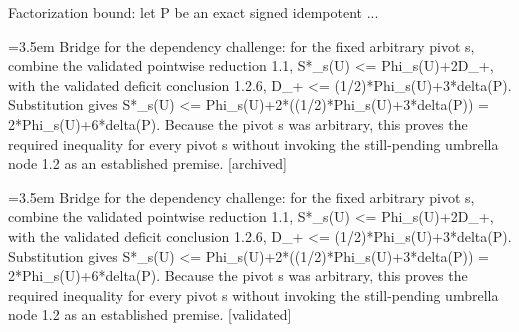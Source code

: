 \documentclass{article}
\newcommand{\step}[1]{\par\noindent\hangindent=3.5em\hangafter=1%
  \makebox[3.5em][l]{\textbf{#1.}}}
\newcommand{\steptag}[1]{\hfill{\small\textsf{[#1]}}}
\begin{document}
\begin{proofbox}{Factorization bound: let P be an exact signed idempotent ...}
\step{1.3.1} Bridge for the dependency challenge: for the fixed arbitrary pivot s, combine the validated pointwise reduction 1.1, S*\_s(U) <= Phi\_s(U)+2D\_+, with the validated deficit conclusion 1.2.6, D\_+ <= (1/2)*Phi\_s(U)+3*delta(P). Substitution gives S*\_s(U) <= Phi\_s(U)+2*((1/2)*Phi\_s(U)+3*delta(P)) = 2*Phi\_s(U)+6*delta(P). Because the pivot s was arbitrary, this proves the required inequality for every pivot s without invoking the still-pending umbrella node 1.2 as an established premise. \steptag{archived} \\[4pt]
\step{1.3.2} Bridge for the dependency challenge: for the fixed arbitrary pivot s, combine the validated pointwise reduction 1.1, S*\_s(U) <= Phi\_s(U)+2D\_+, with the validated deficit conclusion 1.2.6, D\_+ <= (1/2)*Phi\_s(U)+3*delta(P). Substitution gives S*\_s(U) <= Phi\_s(U)+2*((1/2)*Phi\_s(U)+3*delta(P)) = 2*Phi\_s(U)+6*delta(P). Because the pivot s was arbitrary, this proves the required inequality for every pivot s without invoking the still-pending umbrella node 1.2 as an established premise. \steptag{validated} \\[4pt]
\end{proofbox}
\end{document}
